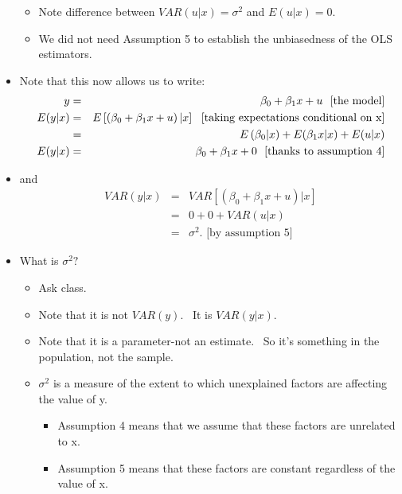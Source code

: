 \documentclass[11pt]{article}
\begin{document}
\begin{itemize}
\begin{itemize}
\item Note difference between $VAR(u|x)=\sigma ^{2}$ and $E(u|x)=0.$

\item We did not need Assumption 5 to establish the unbiasedness of the OLS
estimators.
\end{itemize}

\item Note that this now allows us to write:%
\begin{eqnarray*}
y &=&\beta _{0}+\beta _{1}x+u\text{ \ [the model]} \\
E(y|x) &=&E\left[ \left( \beta _{0}+\beta _{1}x+u\right) |x\right] \text{ \
[taking expectations conditional on x]} \\
&=&E\left( \beta _{0}|x)+E(\beta _{1}x|x)+E(u|x\right) \\
E(y|x) &=&\beta _{0}+\beta _{1}x+0\text{ \ [thanks to assumption 4]}
\end{eqnarray*}

\item and%
\begin{eqnarray*}
VAR(y|x) &=&VAR\left[ \left( \beta _{0}+\beta _{1}x+u\right) |x\right] \\
&=&0+0+VAR(u|x) \\
&=&\sigma ^{2}.\text{ \ [by assumption 5]}
\end{eqnarray*}

\item What is $\sigma ^{2}?$

\begin{itemize}
\item Ask class.

\item Note that it is not $VAR(y).$ \ It is $VAR(y|x).$

\item Note that it is a parameter-not an estimate. \ So it's something in
the population, not the sample.

\item $\sigma ^{2}$ is a measure of the extent to which unexplained factors
are affecting the value of y. \ 

\begin{itemize}
\item Assumption 4 means that we assume that these factors are unrelated to
x.

\item Assumption 5 means that these factors are constant regardless of the
value of x.


\end{itemize}
\end{itemize}
\end{itemize}
\end{document}
